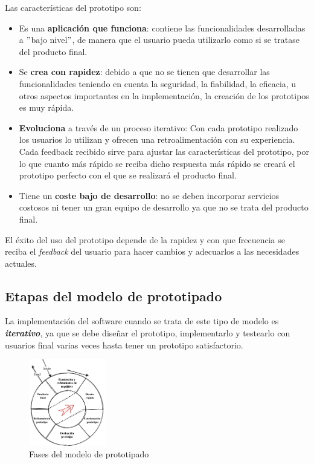Las características del prototipo son: 

\begin{itemize}
    \item Es una \textbf{aplicación que funciona}: contiene las funcionalidades desarrolladas a $"$bajo nivel$"$, de manera que el usuario pueda utilizarlo como si se tratase del producto final.
    \item Se \textbf{crea con rapidez}: debido a que no se tienen que desarrollar las funcionalidades teniendo en cuenta la seguridad, la fiabilidad, la eficacia, u otros aspectos importantes en la implementación, la creación de los prototipos es muy rápida. 
    \item \textbf{Evoluciona} a través de un proceso iterativo:  Con cada prototipo realizado los usuarios lo utilizan y ofrecen una retroalimentación con su experiencia. Cada feedback recibido sirve para ajustar las características del prototipo, por lo que cuanto más rápido se reciba dicho respuesta más rápido se creará el prototipo perfecto con el que se realizará el producto final. 
    \item Tiene un \textbf{coste bajo de desarrollo}: no se deben incorporar servicios costosos ni tener un gran equipo de desarrollo ya que no se trata del producto final. 
\end{itemize}

El éxito del uso del prototipo depende de la rapidez y con que frecuencia se reciba el \textit{feedback} del usuario para hacer cambios y adecuarlos a las necesidades actuales.

\subsection{Etapas del modelo de prototipado}

La implementación del software cuando se trata de este tipo de modelo es \textbf{\textit{iterativo}}, ya que se debe diseñar el prototipo, implementarlo y testearlo con usuarios final varias veces hasta tener un prototipo satisfactorio. \\

\begin{figure}[h]
    \centering
    \includegraphics[width=0.3\textwidth]{cap4_analisis_tecnico/images/modelo_prototipado.png}
    \caption{Fases del modelo de prototipado \cite{modeloProtitipos}}
    \label{fig:modelo_prototipado}
\end{figure}


